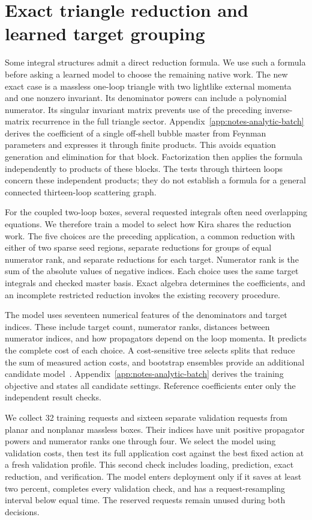 \section{Exact triangle reduction and learned target grouping}
\label{sec:notes-analytic-batch-method}
Some integral structures admit a direct reduction formula. We use such a formula before asking a learned model to choose the remaining native work. The new exact case is a massless one-loop triangle with two lightlike external momenta and one nonzero invariant. Its denominator powers can include a polynomial numerator. Its singular invariant matrix prevents use of the preceding inverse-matrix recurrence in the full triangle sector. Appendix~\ref{app:notes-analytic-batch} derives the coefficient of a single off-shell bubble master from Feynman parameters and expresses it through finite products. This avoids equation generation and elimination for that block. Factorization then applies the formula independently to products of these blocks. The tests through thirteen loops concern these independent products; they do not establish a formula for a general connected thirteen-loop scattering graph.

For the coupled two-loop boxes, several requested integrals often need overlapping equations. We therefore train a model to select how Kira shares the reduction work. The five choices are the preceding application, a common reduction with either of two sparse seed regions, separate reductions for groups of equal numerator rank, and separate reductions for each target. Numerator rank is the sum of the absolute values of negative indices. Each choice uses the same target integrals and checked master basis. Exact algebra determines the coefficients, and an incomplete restricted reduction invokes the existing recovery procedure.

The model uses seventeen numerical features of the denominators and target indices. These include target count, numerator ranks, distances between numerator indices, and how propagators depend on the loop momenta. It predicts the complete cost of each choice. A cost-sensitive tree selects splits that reduce the sum of measured action costs, and bootstrap ensembles provide an additional candidate model~\cite{CART1984,Breiman1996Bagging}. Appendix~\ref{app:notes-analytic-batch} derives the training objective and states all candidate settings. Reference coefficients enter only the independent result checks.

We collect 32 training requests and sixteen separate validation requests from planar and nonplanar massless boxes. Their indices have unit positive propagator powers and numerator ranks one through four. We select the model using validation costs, then test its full application cost against the best fixed action at a fresh validation profile. This second check includes loading, prediction, exact reduction, and verification. The model enters deployment only if it saves at least two percent, completes every validation check, and has a request-resampling interval below equal time. The reserved requests remain unused during both decisions.

